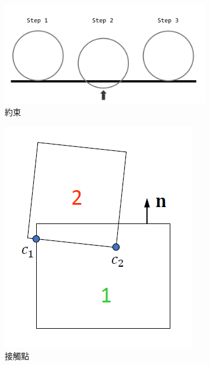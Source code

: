 \begin{figure}[h]
\begin{subfigure}[b]{0.19\linewidth}
    \includegraphics[width=\linewidth]{./resources/physics/Constraint.png}
    \caption{約束}
    \end{subfigure}
    \begin{subfigure}[b]{0.19\linewidth}
    \includegraphics[width=\linewidth]{./resources/physics/contactPoint.png}
    \caption{接觸點}
    \end{subfigure}
    \begin{subfigure}[b]{0.19\linewidth}

\end{subfigure}
\end{figure}
